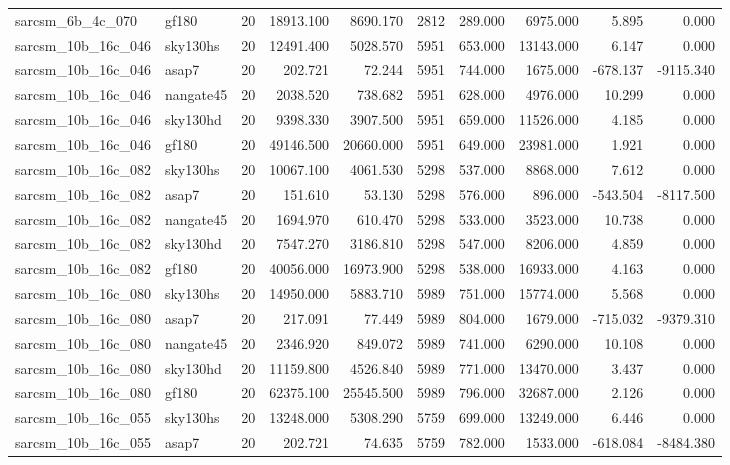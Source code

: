 \begin{tabular}{llrrrrrrrr}
sarcsm\_6b\_4c\_070 & gf180 & 20 & 18913.100 & 8690.170 & 2812 & 289.000 & 6975.000 & 5.895 & 0.000 \\
sarcsm\_10b\_16c\_046 & sky130hs & 20 & 12491.400 & 5028.570 & 5951 & 653.000 & 13143.000 & 6.147 & 0.000 \\
sarcsm\_10b\_16c\_046 & asap7 & 20 & 202.721 & 72.244 & 5951 & 744.000 & 1675.000 & -678.137 & -9115.340 \\
sarcsm\_10b\_16c\_046 & nangate45 & 20 & 2038.520 & 738.682 & 5951 & 628.000 & 4976.000 & 10.299 & 0.000 \\
sarcsm\_10b\_16c\_046 & sky130hd & 20 & 9398.330 & 3907.500 & 5951 & 659.000 & 11526.000 & 4.185 & 0.000 \\
sarcsm\_10b\_16c\_046 & gf180 & 20 & 49146.500 & 20660.000 & 5951 & 649.000 & 23981.000 & 1.921 & 0.000 \\
sarcsm\_10b\_16c\_082 & sky130hs & 20 & 10067.100 & 4061.530 & 5298 & 537.000 & 8868.000 & 7.612 & 0.000 \\
sarcsm\_10b\_16c\_082 & asap7 & 20 & 151.610 & 53.130 & 5298 & 576.000 & 896.000 & -543.504 & -8117.500 \\
sarcsm\_10b\_16c\_082 & nangate45 & 20 & 1694.970 & 610.470 & 5298 & 533.000 & 3523.000 & 10.738 & 0.000 \\
sarcsm\_10b\_16c\_082 & sky130hd & 20 & 7547.270 & 3186.810 & 5298 & 547.000 & 8206.000 & 4.859 & 0.000 \\
sarcsm\_10b\_16c\_082 & gf180 & 20 & 40056.000 & 16973.900 & 5298 & 538.000 & 16933.000 & 4.163 & 0.000 \\
sarcsm\_10b\_16c\_080 & sky130hs & 20 & 14950.000 & 5883.710 & 5989 & 751.000 & 15774.000 & 5.568 & 0.000 \\
sarcsm\_10b\_16c\_080 & asap7 & 20 & 217.091 & 77.449 & 5989 & 804.000 & 1679.000 & -715.032 & -9379.310 \\
sarcsm\_10b\_16c\_080 & nangate45 & 20 & 2346.920 & 849.072 & 5989 & 741.000 & 6290.000 & 10.108 & 0.000 \\
sarcsm\_10b\_16c\_080 & sky130hd & 20 & 11159.800 & 4526.840 & 5989 & 771.000 & 13470.000 & 3.437 & 0.000 \\
sarcsm\_10b\_16c\_080 & gf180 & 20 & 62375.100 & 25545.500 & 5989 & 796.000 & 32687.000 & 2.126 & 0.000 \\
sarcsm\_10b\_16c\_055 & sky130hs & 20 & 13248.000 & 5308.290 & 5759 & 699.000 & 13249.000 & 6.446 & 0.000 \\
sarcsm\_10b\_16c\_055 & asap7 & 20 & 202.721 & 74.635 & 5759 & 782.000 & 1533.000 & -618.084 & -8484.380 \\

\end{tabular}
